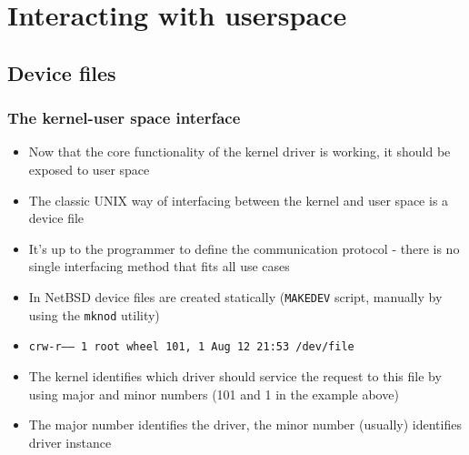 \documentclass[dvipsnames,table]{beamer}
\begin{document}
\section{Interacting with userspace}

\subsection{Device files}

\begin{frame}
\frametitle{The kernel-user space interface}
\begin{itemize}
	\item Now that the core functionality of the kernel driver is working, it should be exposed to user space
	\item The classic UNIX way of interfacing between the kernel and user space is a device file
	\item It's up to the programmer to define the communication protocol - there is no single interfacing method that fits all use cases
	\item In NetBSD device files are created statically ({\tt MAKEDEV} script, manually by using the {\tt mknod} utility)
	\scriptsize
	\item {\tt crw-r-----  1 root  wheel  101, 1 Aug 12 21:53 /dev/file}
	\normalsize
	\item The kernel identifies which driver should service the request to this file by using major and minor numbers (101 and 1 in the example above)
	\item The major number identifies the driver, the minor number (usually) identifies driver instance
\end{itemize}
\end{frame}
\end{document}
